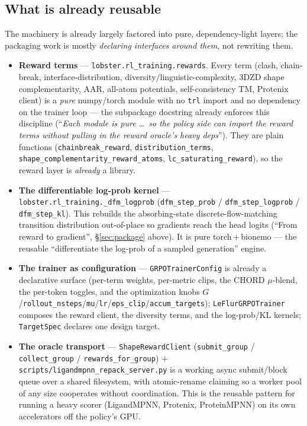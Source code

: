 \documentclass[11pt]{article}
\newcommand{\ttk}[1]{\texttt{\small #1}}
\begin{document}
\subsection{What is already reusable}
The machinery is already largely factored into pure, dependency-light layers; the packaging work is
mostly \emph{declaring interfaces around them}, not rewriting them.
\begin{itemize}
\item \textbf{Reward terms} --- \ttk{lobster.rl\_training.rewards}. Every term (clash, chain-break,
  interface-distribution, diversity/linguistic-complexity, 3DZD shape complementarity, AAR, all-atom
  potentials, self-consistency TM, Protenix client) is a \emph{pure} numpy/torch module with no
  \ttk{trl} import and no dependency on the trainer loop --- the subpackage docstring already
  enforces this discipline (``\emph{Each module is pure \dots\ so the policy side can import the
  reward terms without pulling in the reward oracle's heavy deps}''). They are plain functions
  (\ttk{chainbreak\_reward}, \ttk{distribution\_terms}, \ttk{shape\_complementarity\_reward\_atoms},
  \ttk{lc\_saturating\_reward}), so the reward layer is \emph{already} a library.
\item \textbf{The differentiable log-prob kernel} --- \ttk{lobster.rl\_training.\_dfm\_logprob}
  (\ttk{dfm\_step\_prob} / \ttk{dfm\_step\_logprob} / \ttk{dfm\_step\_kl}). This rebuilds the
  absorbing-state discrete-flow-matching transition distribution out-of-place so gradients reach the
  head logits (``From reward to gradient'', \S\ref{sec:package} above). It is pure
  torch\,$+$\,bionemo --- the reusable ``differentiate the log-prob of a sampled generation'' engine.
\item \textbf{The trainer as configuration} --- \ttk{GRPOTrainerConfig} is already a declarative
  surface (per-term weights, per-metric clips, the CHORD $\mu$-blend, the per-token toggles, and the
  optimization knobs $G$/\ttk{rollout\_nsteps}/\ttk{mu}/\ttk{lr}/\ttk{eps\_clip}/\ttk{accum\_targets});
  \ttk{LeFlurGRPOTrainer} composes the reward client, the diversity terms, and the log-prob/KL
  kernels; \ttk{TargetSpec} declares one design target.
\item \textbf{The oracle transport} --- \ttk{ShapeRewardClient} (\ttk{submit\_group} /
  \ttk{collect\_group} / \ttk{rewards\_for\_group}) $+$ \ttk{scripts/ligandmpnn\_repack\_server.py}
  is a working async submit/block queue over a shared filesystem, with atomic-rename claiming so a
  worker pool of any size cooperates without coordination. This is the reusable pattern for running
  a heavy scorer (LigandMPNN, Protenix, ProteinMPNN) on its own accelerators off the policy's GPU.
\end{itemize}
\end{document}
